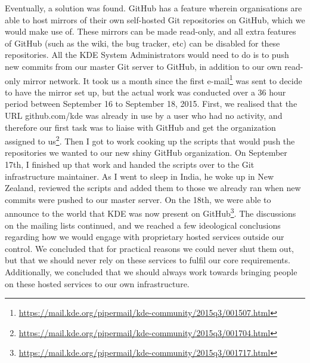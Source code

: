 Eventually, a solution was found. GitHub has a feature wherein organisations are able to host mirrors of their own self-hosted Git repositories on GitHub, which we would make use of. These mirrors can be made read-only, and all extra features of GitHub (such as the wiki, the bug tracker, etc) can be disabled for these repositories. All the KDE System Administrators would need to do is to push new commits from our master Git server to GitHub, in addition to our own read-only mirror network.
It took us a month since the first e-mail\footnote{\url{https://mail.kde.org/pipermail/kde-community/2015q3/001507.html}} was sent to decide to have the mirror set up, but the actual work was conducted over a 36 hour period between September 16 to September 18, 2015. First, we realised that the URL github.com/kde was already in use by a user who had no activity, and therefore our first task was to liaise with GitHub and get the organization assigned to us\footnote{\url{https://mail.kde.org/pipermail/kde-community/2015q3/001704.html}}. Then I got to work cooking up the scripts that would push the repositories we wanted to our new shiny GitHub organization. On September 17th, I finished up that work and handed the scripts over to the Git infrastructure maintainer. As I went to sleep in India, he woke up in New Zealand, reviewed the scripts and added them to those we already ran when new commits were pushed to our master server. On the 18th, we were able to announce to the world that KDE was now present on GitHub\footnote{\url{https://mail.kde.org/pipermail/kde-community/2015q3/001717.html}}.
The discussions on the mailing lists continued, and we reached a few ideological conclusions regarding how we would engage with proprietary hosted services outside our control. We concluded that for practical reasons we could never shut them out, but that we should never rely on these services to fulfil our core requirements. Additionally, we concluded that we should always work towards bringing people on these hosted services to our own infrastructure.

